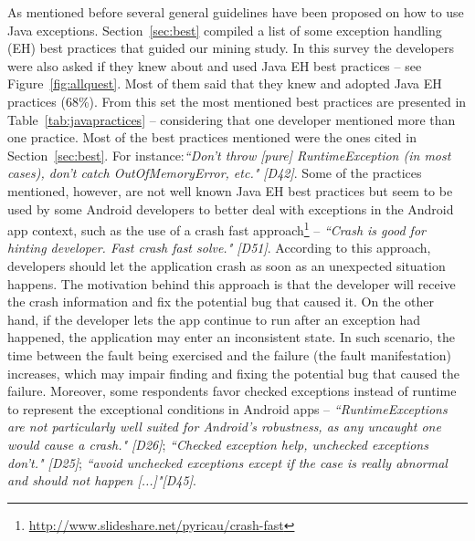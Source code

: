 {%
As mentioned before several general guidelines have been proposed on how to
use Java exceptions. Section~\ref{sec:best}  compiled a list of some exception
handling (EH) best practices that guided our mining study. In this survey the
developers were also asked if they knew about and used Java EH best practices --
see Figure~\ref{fig:allquest}. Most of them said that they knew and adopted Java
EH practices (68\%). From this set the most mentioned best practices are
presented in Table~\ref{tab:javapractices} -- considering that one developer
mentioned more than one practice. Most of the best practices mentioned were the
ones cited in Section~\ref{sec:best}. For instance:\emph{``Don't throw [pure]
RuntimeException (in most cases), don't catch OutOfMemoryError, etc." [D42]}.
Some of the practices mentioned, however, are not well known Java EH best
practices but seem to be used by some Android developers to better deal with
exceptions in the Android app context, such as the use of a crash fast
approach\footnote{\url{http://www.slideshare.net/pyricau/crash-fast}} --
\emph{``Crash is good for hinting developer. Fast crash fast solve." [D51]}.
According to this approach, developers should let the
application crash as soon as an unexpected situation happens. The motivation
behind this approach is that the developer will receive the crash information
and fix the potential bug that caused it. On the other hand, if the developer
lets the app continue to run after an exception had happened, the
application may enter an inconsistent state. In such scenario, the time between the fault being exercised and the failure (the fault manifestation) increases, which may impair finding and fixing the potential bug that caused the failure. Moreover, some respondents favor checked exceptions instead of runtime to represent the exceptional conditions in Android apps -- \emph{``RuntimeExceptions are not particularly well suited for Android's robustness, as any uncaught one would cause a crash." [D26]}; \emph{``Checked exception help, unchecked exceptions don't." [D25]}; \emph{``avoid unchecked exceptions except if the case is really abnormal and should not happen [...]"[D45]}.

}
